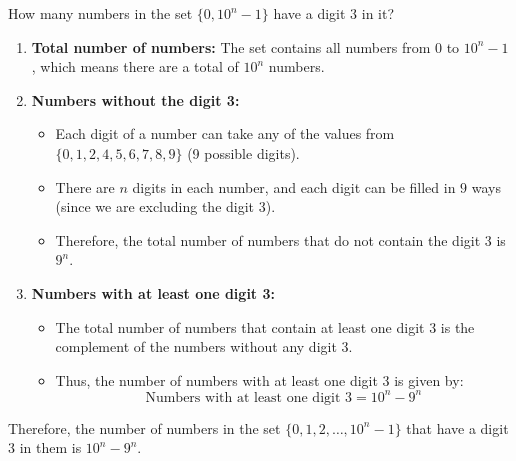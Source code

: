     \begin{example}
        How many numbers in the set $\{0, 10^n - 1\}$ have a digit $3$ in it?

        \begin{enumerate}
            \item \textbf{Total number of numbers:}  
            The set contains all numbers from $0$ to $10^n - 1$, which means there are a total of $10^n$ numbers.
            
            \item \textbf{Numbers without the digit 3:}
            \begin{itemize}
                \item Each digit of a number can take any of the values from $\{0, 1, 2, 4, 5, 6, 7, 8, 9\}$ (9 possible digits).
                \item There are $n$ digits in each number, and each digit can be filled in $9$ ways (since we are excluding the digit 3).
                \item Therefore, the total number of numbers that do not contain the digit 3 is $9^n$.
            \end{itemize}

            \item \textbf{Numbers with at least one digit 3:}
            \begin{itemize}
                \item The total number of numbers that contain at least one digit 3 is the complement of the numbers without any digit 3.
                \item Thus, the number of numbers with at least one digit 3 is given by:
                \[
                \text{Numbers with at least one digit 3} = 10^n - 9^n
                \]
            \end{itemize}
        \end{enumerate}

        Therefore, the number of numbers in the set $\{0, 1, 2, \dots, 10^n - 1\}$ that have a digit 3 in them is $10^n - 9^n$.
    \end{example}